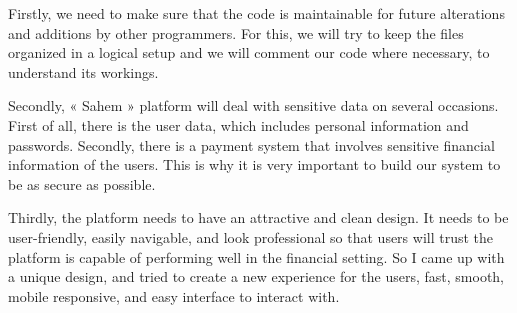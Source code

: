 Firstly, we need to make sure
that the code is maintainable for future alterations and additions by other programmers. For this, we will try
to keep the files organized in a logical setup and we will comment our code where necessary, to understand
its workings.

Secondly, « Sahem » platform will deal with sensitive data on several occasions. First of all, there
is the user data, which includes personal information and passwords. Secondly, there is a payment system
that involves sensitive financial information of the users. This is why it is very important to build our system
to be as secure as possible.

Thirdly, the platform needs to have an attractive and clean design. It needs to be user-friendly, easily navigable, and look professional so that users will trust the platform is capable of performing
well in the financial setting. So I came up with a unique design, and tried to create a new experience for the users, fast,
smooth, mobile responsive, and easy interface to interact with.
